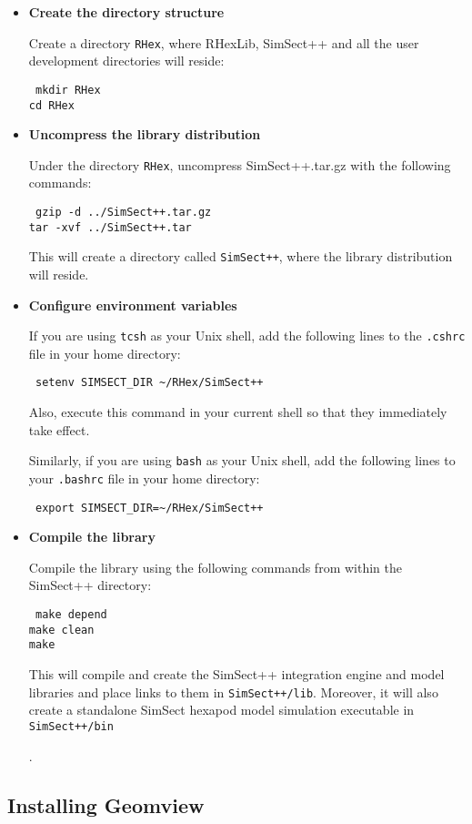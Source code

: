 \begin{itemize}
\item{{\bf Create the directory structure}

Create a directory {\tt RHex}, where RHexLib, SimSect++ and all the user
development directories will reside:

{\tt 
mkdir RHex \\
cd RHex
}}

\item{{\bf Uncompress the library distribution}

Under the directory {\tt RHex}, uncompress SimSect++.tar.gz with the
following commands:

{\tt
gzip -d ../SimSect++.tar.gz\\
tar -xvf ../SimSect++.tar
}

This will create a directory called {\tt SimSect++}, where the library
distribution will reside.}

\item{{\bf Configure environment variables}

If you are using {\tt tcsh} as your Unix shell, add the following lines to
the {\tt .cshrc} file in your home directory:

{\tt
setenv SIMSECT\_DIR \~{}/RHex/SimSect++
}

Also, execute this command in your current shell so that they immediately
take effect.

Similarly, if you are using {\tt bash} as your Unix shell, add the following
lines to your {\tt .bashrc} file in your home directory:

{\tt
export SIMSECT\_DIR=\~{}/RHex/SimSect++
}}

\item{{\bf Compile the library}

Compile the library using the following commands from within the SimSect++
directory:

{\tt
make depend \\
make clean \\
make
}

This will compile and create the SimSect++ integration engine and model
libraries and place links to them in {\tt SimSect++/lib}. Moreover, it will
also create a standalone SimSect hexapod model simulation executable in {\tt
SimSect++/bin} }.

\end{itemize}

\subsection{Installing Geomview}

